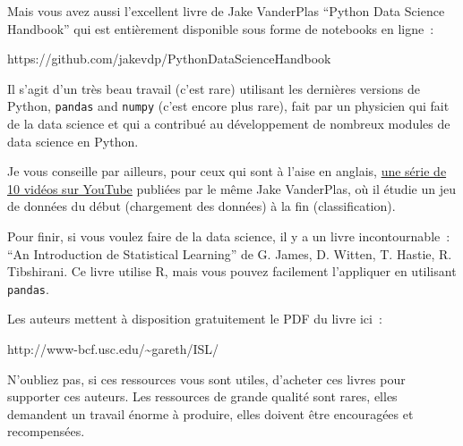     Mais vous avez aussi l'excellent livre de Jake VanderPlas ``Python Data
Science Handbook'' qui est entièrement disponible sous forme de
notebooks en ligne~:

https://github.com/jakevdp/PythonDataScienceHandbook

Il s'agit d'un très beau travail (c'est rare) utilisant les dernières
versions de Python, \texttt{pandas} and \texttt{numpy} (c'est encore
plus rare), fait par un physicien qui fait de la data science et qui a
contribué au développement de nombreux modules de data science en
Python.

Je vous conseille par ailleurs, pour ceux qui sont à l'aise en anglais,
\href{https://www.youtube.com/watch?v=_ZEWDGpM-vM}{une série de 10
vidéos sur YouTube} publiées par le même Jake VanderPlas, où il étudie
un jeu de données du début (chargement des données) à la fin
(classification).

    Pour finir, si vous voulez faire de la data science, il y a un livre
incontournable~: ``An Introduction de Statistical Learning'' de G.
James, D. Witten, T. Hastie, R. Tibshirani. Ce livre utilise R, mais
vous pouvez facilement l'appliquer en utilisant \texttt{pandas}.

Les auteurs mettent à disposition gratuitement le PDF du livre ici~:

http://www-bcf.usc.edu/\textasciitilde{}gareth/ISL/

    N'oubliez pas, si ces ressources vous sont utiles, d'acheter ces livres
pour supporter ces auteurs. Les ressources de grande qualité sont rares,
elles demandent un travail énorme à produire, elles doivent être
encouragées et recompensées.


    
    
    
